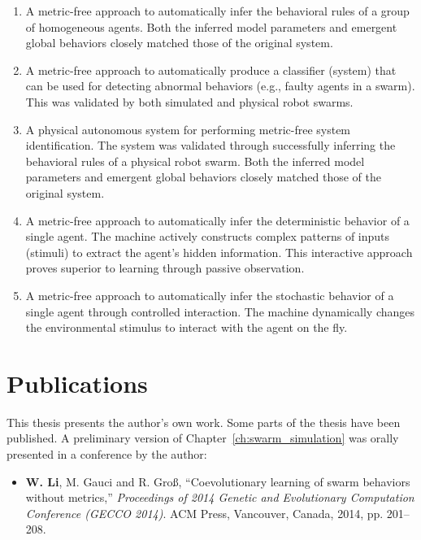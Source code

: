 \begin{enumerate}[1)]

\item A metric-free approach to automatically infer the behavioral rules of a group of homogeneous agents. Both the inferred model parameters and emergent global behaviors closely matched those of the original system. 

\item A metric-free approach to automatically produce a classifier (system) that can be used for detecting abnormal behaviors (e.g., faulty agents in a swarm). This was validated by both simulated and physical robot swarms.

\item A physical autonomous system for performing metric-free system identification. The system was validated through successfully inferring the behavioral rules of a physical robot swarm. Both the inferred model parameters and emergent global behaviors closely matched those of the original system. 

\item A metric-free approach to automatically infer the deterministic behavior of a single agent. The machine actively constructs complex patterns of inputs (stimuli) to extract the agent's hidden information. This interactive approach proves superior to learning through passive observation. 

\item A metric-free approach to automatically infer the stochastic behavior of a single agent through controlled interaction. The machine dynamically changes the environmental stimulus to interact with the agent on the fly. 

\end{enumerate}

\section{Publications}

This thesis presents the author's own work. Some parts of the thesis have been published. A preliminary version of Chapter~\ref{ch:swarm_simulation} was orally presented in a conference by the author:
\begin{itemize}
%
\item \textbf{W. Li}, M. Gauci and R. Gro{\ss}, ``Coevolutionary learning of swarm behaviors without metrics,'' \textit{Proceedings of 2014 Genetic and Evolutionary Computation Conference (GECCO 2014)}. ACM Press, Vancouver, Canada, 2014, pp. 201--208.
%
\end{itemize}

